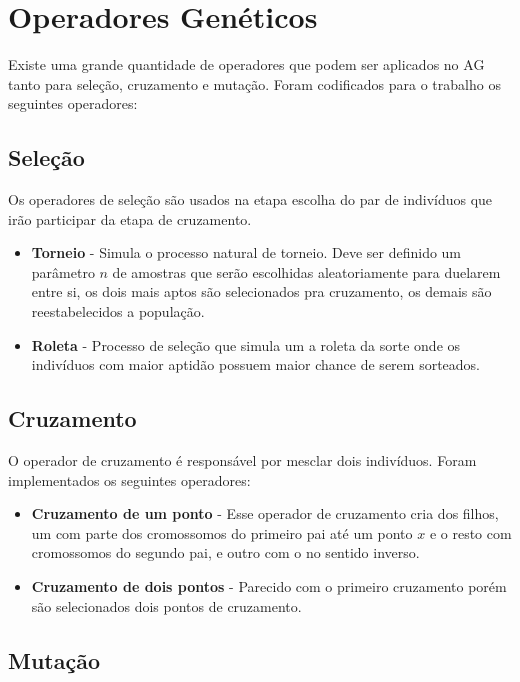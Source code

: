 \documentclass[conference]{IEEEtran}
\begin{document}
\section{Operadores Genéticos}

Existe uma grande quantidade de operadores que podem ser aplicados no AG tanto para seleção, cruzamento e mutação. Foram codificados para o trabalho os seguintes operadores:

\subsection{Seleção}

Os operadores de seleção são usados na etapa escolha do par de indivíduos que irão participar da etapa de cruzamento.

\begin{itemize}
  \item \textbf{Torneio} - Simula o processo natural de torneio. Deve ser definido um parâmetro $n$ de amostras que serão escolhidas aleatoriamente para duelarem entre si, os dois mais aptos são selecionados pra cruzamento, os demais são reestabelecidos a população.
  \item \textbf{Roleta} - Processo de seleção que simula um a roleta da sorte onde os indivíduos com maior aptidão possuem maior chance de serem sorteados.
\end{itemize}

\subsection{Cruzamento}

O operador de cruzamento é responsável por mesclar dois indivíduos. Foram implementados os seguintes operadores:

\begin{itemize}
  \item \textbf{Cruzamento de um ponto} - Esse operador de cruzamento cria dos filhos, um com parte dos cromossomos do primeiro pai até um ponto $x$ e o resto com cromossomos do segundo pai, e outro com o no sentido inverso.
  \item \textbf{Cruzamento de dois pontos} - Parecido com o primeiro cruzamento porém são selecionados dois pontos de cruzamento.
\end{itemize}

\subsection{Mutação}
\end{document}
